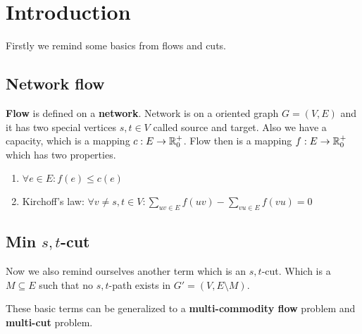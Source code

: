 \chapter{Introduction}

Firstly we remind some basics from flows and cuts. 

\section{Network flow}

\textbf{Flow} is defined on a \textbf{network}. Network is on a oriented graph $G = (V,E)$ and it has two special vertices $s,t \in V$ called source and target. Also we have a capacity, which is a mapping $c : E \to \mathbb{R}_{0}^{+}$. Flow then is a mapping $f : E \to \mathbb{R}_{0}^{+}$ which has two properties.

\begin{enumerate}
	\item $\forall e \in E: f(e) \leq c(e)$
	\item Kirchoff's law: $\forall v \neq s, t \in V: \sum_{uv \in E} f(uv) - \sum_{vu \in E} f(vu) = 0$
\end{enumerate}

\section{Min $s,t$-cut}

Now we also remind ourselves another term which is an $s,t$-cut. Which is a $M \subseteq E$ such that no $s,t$-path exists in $G' = (V, E \setminus M)$.

These basic terms can be generalized to a \textbf{multi-commodity flow} problem and \textbf{multi-cut} problem.